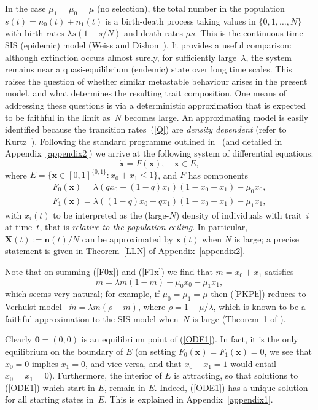 \documentclass[12pt]{article}
\newcommand{\bn}{\boldsymbol{n}}
\newcommand{\bX}{\boldsymbol{X}}
\newcommand{\bzero}{\boldsymbol{0}}
\newcommand{\bx}{\boldsymbol{x}}
\begin{document}
In the case $\mu_1=\mu_0=\mu$ (no selection), the total number in the
population $s(t)=n_0(t)+n_1(t)$ is a birth-death process taking values
in $\{0,1,\dots,N\}$ with birth rates $\lambda s(1-s/N)$ and death rates
$\mu s$. This is the continuous-time SIS (epidemic) model (Weiss and
Dishon~\cite{WD71}). It provides a useful comparison: although
extinction occurs almost surely, for sufficiently large~$\lambda$, the
system remains near a quasi-equilibrium (endemic) state over long time
scales. This raises the question of whether similar metastable behaviour
arises in the present model, and what determines the resulting trait
composition. One means of addressing these questions is via a
deterministic approximation that is expected to be faithful in the limit
as~$N$ becomes large. An approximating model is easily identified
because the transition rates~(\ref{Q}) are {\em density dependent\/}
(refer to Kurtz~\cite{Kur70}). Following the standard programme outlined
in~\cite{Kur70} (and detailed in Appendix~\ref{appendix2}) we arrive at
the following system of differential equations:
\begin{equation}
\dot{\bx}
= 
F(\bx),\quad \bx\in E,
\label{ODE1}
\end{equation}
where $E=\{\bx\in [0,1]^{\{0,1\}}: x_0+x_1\leq 1\}$, and $F$ has
components
\begin{align}
F_0(\bx)=\lambda(q x_0 + (1-q)x_1)(1-x_0-x_1)-\mu_0 x_0,
\label{F0x}
\\
F_1(\bx)=\lambda((1-q) x_0 + q x_1)(1-x_0-x_1)-\mu_1 x_1,
\label{F1x}
\end{align}
with $x_i(t)$ to be interpreted as the (large-$N$) density of
individuals with trait~$i$ at time~$t$, that is {\em relative to the
population ceiling\/}. In particular, $\bX(t):=\bn(t)/N$ 
can be approximated by
$\bx(t)$ when $N$ is large; a precise statement is given in 
Theorem~\ref{LLN} of Appendix~\ref{appendix2}.

Note that on summing (\ref{F0x}) and (\ref{F1x}) we find that 
$m=x_0+x_1$ satisfies
\begin{equation}
\dot{m}= \lambda m(1-m)-\mu_0 x_0 -\mu_1 x_1,
\label{PKPh}
\end{equation}
which seems very natural; for example, if $\mu_0=\mu_1=\mu$ then (\ref{PKPh})
reduces to Verhulst model~\cite{Ver1838} $\dot{m}=\lambda m(\rho-m)$,
where $\rho=1-\mu/\lambda$, which is known to be a faithful
approximation to the SIS model when~$N$ is large (Theorem~1 of \cite{Pol24}). 

Clearly $\bzero=(0,0)$ is an equilibrium point of (\ref{ODE1}). In fact,
it is the only equilibrium on the boundary of $E$ (on setting
$F_0(\bx)=F_1(\bx)=0$, we see that $x_0=0$ implies $x_1=0$, and vice
versa, and that $x_0+x_1=1$ would entail $x_0=x_1=0$). Furthermore, the
interior of $E$ is attracting, so that solutions to (\ref{ODE1}) which
start in $E$, remain in $E$. Indeed, (\ref{ODE1}) has a unique solution
for all starting states in~$E$. This is explained in
Appendix~\ref{appendix1}.
\end{document}
